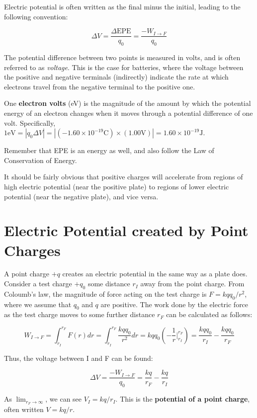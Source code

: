 \documentclass[12pt, a4paper]{article}
\theoremstyle{definition}
\begin{document}
Electric potential is often written as the final minus the initial, leading to the following convention:

\[\Delta V = \frac{\Delta \textrm{EPE}}{q_0} = \frac{-W_{I \to F}}{q_0}\]

The potential difference between two points is measured in volts, and is often referred to as \textit{voltage}.
This is the case for batteries, where the voltage between the positive and negative terminals (indirectly) indicate the rate at which electrons travel from the negative terminal to the positive one.

One \textbf{electron volts} (eV) is the magnitude of the amount by which the potential energy of an electron changes when it moves through a potential difference of one volt.
Specifically, $1 \textrm{eV} = |q_0 \Delta V| = |(-1.60 \times 10^{-19} \textrm{C}) \times (1.00 \textrm{V})| = 1.60 \times 10^{-19} \textrm{J}$.

Remember that EPE is an energy as well, and also follow the Law of Conservation of Energy.

It should be fairly obvious that positive charges will accelerate from regions of high electric potential (near the positive plate) to regions of lower electric potential (near the negative plate), and vice versa.

\section{Electric Potential created by Point Charges}
A point charge $+q$ creates an electric potential in the same way as a plate does.
Consider a test charge $+q_0$ some distance $r_I$ away from the point charge.
From Coloumb's law, the magnitude of force acting on the test charge is $F = kqq_0/r^2$, where we assume that $q_0$ and $q$ are positive.
The work done by the electric force as the test charge moves to some further distance $r_F$ can be calculated as follows:

\[W_{I \to F} = \int_{r_I}^{r_F} F(r)dr = \int_{r_I}^{r_F} \frac{kqq_0}{r^2}dr = kqq_0 (-\frac{1}{r} \Big|_{r_I}^{r_F}) = \frac{kqq_0}{r_I} - \frac{kqq_0}{r_F}\]

Thus, the voltage between I and F can be found:

\[\Delta V = \frac{-W_{I \to F}}{q_0} = \frac{kq}{r_F} - \frac{kq}{r_I}\]

As $\lim_{r_F \to \infty}$, we can see $V_I = kq/r_I$. This is the \textbf{potential of a point charge}, often written $V = kq/r$.
\end{document}
